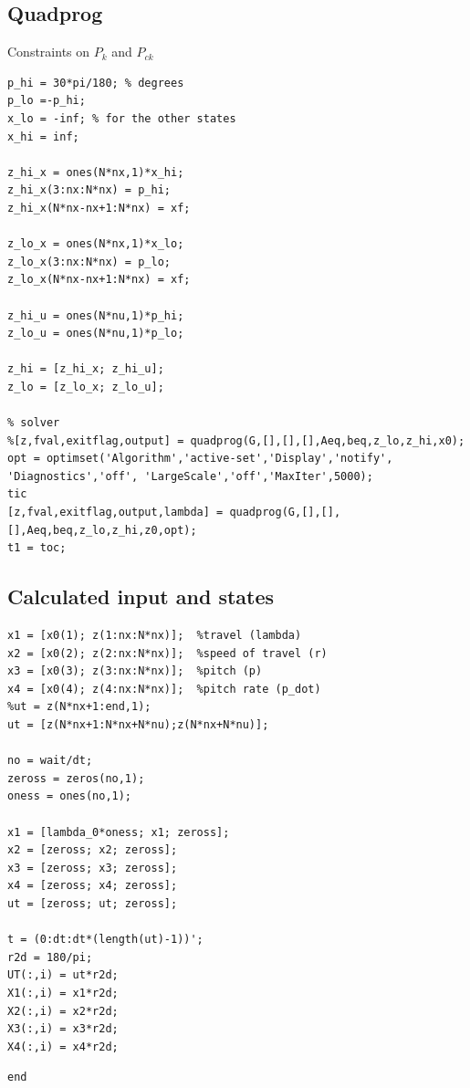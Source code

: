 \documentclass[11pt,a4paper,USenglish]{article} %
\begin{document}
\subsection*{Quadprog}

\begin{par}
Constraints on $P_{k}$ and $P_{ck}$ 
\end{par} \vspace{1em}
\begin{verbatim}
p_hi = 30*pi/180; % degrees
p_lo =-p_hi;
x_lo = -inf; % for the other states
x_hi = inf;

z_hi_x = ones(N*nx,1)*x_hi;
z_hi_x(3:nx:N*nx) = p_hi;
z_hi_x(N*nx-nx+1:N*nx) = xf;

z_lo_x = ones(N*nx,1)*x_lo;
z_lo_x(3:nx:N*nx) = p_lo;
z_lo_x(N*nx-nx+1:N*nx) = xf;

z_hi_u = ones(N*nu,1)*p_hi;
z_lo_u = ones(N*nu,1)*p_lo;

z_hi = [z_hi_x; z_hi_u];
z_lo = [z_lo_x; z_lo_u];

% solver
%[z,fval,exitflag,output] = quadprog(G,[],[],[],Aeq,beq,z_lo,z_hi,x0);
opt = optimset('Algorithm','active-set','Display','notify', 'Diagnostics','off', 'LargeScale','off','MaxIter',5000);
tic
[z,fval,exitflag,output,lambda] = quadprog(G,[],[],[],Aeq,beq,z_lo,z_hi,z0,opt);
t1 = toc;
\end{verbatim}

\subsection*{Calculated input and states}

\begin{verbatim}
x1 = [x0(1); z(1:nx:N*nx)];  %travel (lambda)
x2 = [x0(2); z(2:nx:N*nx)];  %speed of travel (r)
x3 = [x0(3); z(3:nx:N*nx)];  %pitch (p)
x4 = [x0(4); z(4:nx:N*nx)];  %pitch rate (p_dot)
%ut = z(N*nx+1:end,1);
ut = [z(N*nx+1:N*nx+N*nu);z(N*nx+N*nu)];

no = wait/dt;
zeross = zeros(no,1);
oness = ones(no,1);

x1 = [lambda_0*oness; x1; zeross];
x2 = [zeross; x2; zeross];
x3 = [zeross; x3; zeross];
x4 = [zeross; x4; zeross];
ut = [zeross; ut; zeross];

t = (0:dt:dt*(length(ut)-1))';
r2d = 180/pi;
UT(:,i) = ut*r2d;
X1(:,i) = x1*r2d;
X2(:,i) = x2*r2d;
X3(:,i) = x3*r2d;
X4(:,i) = x4*r2d;
\end{verbatim}
\begin{verbatim}
end
\end{verbatim}
\end{document}
